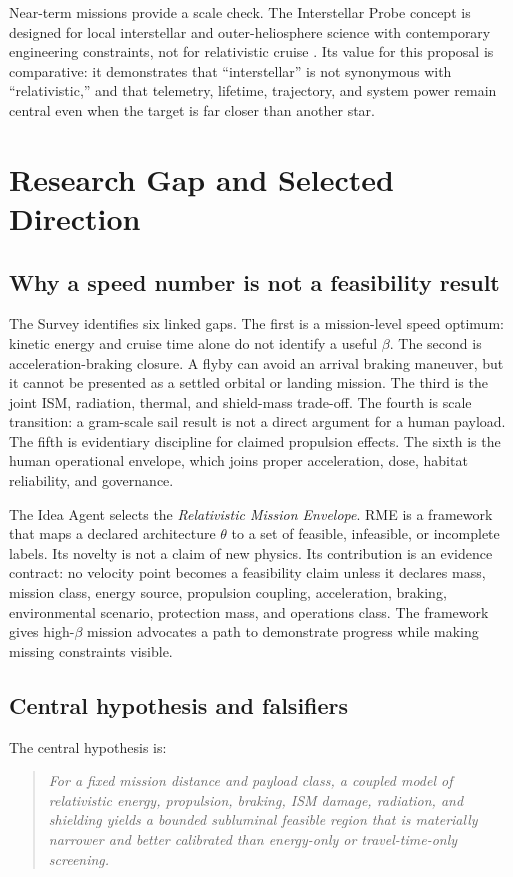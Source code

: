 \documentclass[conference]{../../../../Conference-LaTeX-template_10-17-19/IEEEtran}
\begin{document}
Near-term missions provide a scale check. The Interstellar Probe concept is designed for local interstellar and outer-heliosphere science with contemporary engineering constraints, not for relativistic cruise \cite{mcnutt2022}. Its value for this proposal is comparative: it demonstrates that ``interstellar'' is not synonymous with ``relativistic,'' and that telemetry, lifetime, trajectory, and system power remain central even when the target is far closer than another star.

\section{Research Gap and Selected Direction}
\subsection{Why a speed number is not a feasibility result}
The Survey identifies six linked gaps. The first is a mission-level speed optimum: kinetic energy and cruise time alone do not identify a useful $\beta$. The second is acceleration-braking closure. A flyby can avoid an arrival braking maneuver, but it cannot be presented as a settled orbital or landing mission. The third is the joint ISM, radiation, thermal, and shield-mass trade-off. The fourth is scale transition: a gram-scale sail result is not a direct argument for a human payload. The fifth is evidentiary discipline for claimed propulsion effects. The sixth is the human operational envelope, which joins proper acceleration, dose, habitat reliability, and governance.

The Idea Agent selects the \textit{Relativistic Mission Envelope}. RME is a framework that maps a declared architecture $\theta$ to a set of feasible, infeasible, or incomplete labels. Its novelty is not a claim of new physics. Its contribution is an evidence contract: no velocity point becomes a feasibility claim unless it declares mass, mission class, energy source, propulsion coupling, acceleration, braking, environmental scenario, protection mass, and operations class. The framework gives high-$\beta$ mission advocates a path to demonstrate progress while making missing constraints visible.

\subsection{Central hypothesis and falsifiers}
The central hypothesis is:
\begin{quote}
\textit{For a fixed mission distance and payload class, a coupled model of relativistic energy, propulsion, braking, ISM damage, radiation, and shielding yields a bounded subluminal feasible region that is materially narrower and better calibrated than energy-only or travel-time-only screening.}
\end{quote}
\end{document}
